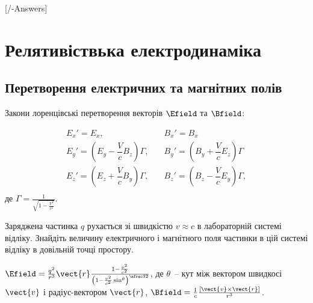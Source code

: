 
[\currfilebase/\currfilebase-Answers]
\chapter{Релятивіствька електродинаміка}\label{\currfilebase}

\section{Перетворення електричних та магнітних полів}
\begin{Theory}
Закони лоренцівські перетворення векторів $\Efield$ та $\Bfield$:

\begin{align*}
	E_x' =  E_x, \quad                                        & B_x' = B_x \\
	E_y' = \left( E_y - \dfrac Vc B_z\right) \Gamma, \quad &
	B_y' = \left( B_y + \dfrac Vc E_z\right) \Gamma                     \\
	E_z' = \left( E_z + \dfrac Vc B_y\right) \Gamma, \quad &
	B_z' = \left( B_z - \dfrac Vc E_y\right) \Gamma,                    \\
\end{align*}
де $\Gamma = \frac{1}{\sqrt{1 - \frac{V^2}{c^2}}}$. 
\end{Theory}

\begin{problem}
    Заряджена частинка $q$ рухається зі швидкістю $v \approx c$ в лабораторній системі відліку. Знайдіть величину електричного і магнітного поля частинки в цій системі відліку в довільній точці простору.
\begin{solution}
	$\Efield = \frac{q^2}{r^3}\vect{r} \frac{1 - \frac{v^2}{c^2}}{ \left( 1 - \frac{v^2}{c^2}\sin^\theta \right)^{\nfrac32}}$, де $\theta$~-- кут між вектором швидкосі $\vect{v}$ і радіус-вектором $\vect{r}$, $\Bfield = \frac1c \frac{\left[ \vect{v}\times\vect{r}\right] }{r^3}$.
\end{solution}
\end{problem}

